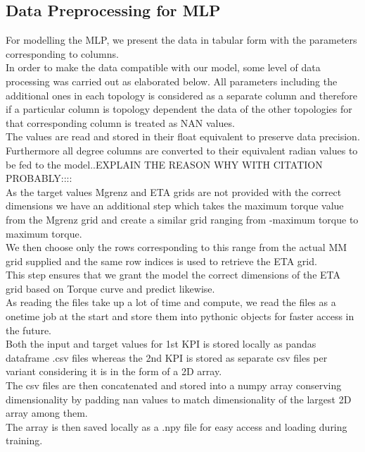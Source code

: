 \documentclass{report} %
\begin{document}
\subsection*{Data Preprocessing for \ac{MLP}}

For modelling the \ac{MLP}, we present the data in tabular form with the parameters corresponding to columns. \\
In order to make the data compatible with our model, some level of data processing was carried out as elaborated below.
All parameters including the additional ones in each topology is considered as a separate column and therefore if a particular column is topology dependent the data of the other topologies for that corresponding column is treated as NAN values.\\
The values are read and stored in their float equivalent to preserve data precision. Furthermore all degree columns are converted to their equivalent radian values to be fed to the model..EXPLAIN THE REASON WHY WITH CITATION PROBABLY::::\\
As the target values Mgrenz and ETA grids are not provided with the correct dimensions we have an additional step which takes the maximum torque value from the Mgrenz grid and create a similar grid ranging from -maximum torque to maximum torque. \\
We then choose only the rows corresponding to this range from the actual MM grid supplied and the same row indices is used to retrieve the ETA grid. \\
This step ensures that we grant the model the correct dimensions of the ETA grid based on Torque curve and predict likewise.\\

As reading the files take up a lot of time and compute, we read the files as a onetime job at the start and store them into pythonic objects for faster access in the future.\\
Both the input and target values for 1st \ac{KPI} is stored locally as pandas dataframe .csv files whereas the 2nd \ac{KPI} is stored as separate csv files per variant considering it is in the form of a \ac{2D} array.\\
The csv files are then concatenated and stored into a numpy array conserving dimensionality by padding nan values to match dimensionality of the largest \ac{2D} array among them.\\
The array is then saved locally as a .npy file for easy access and loading during training.\\
\end{document}
